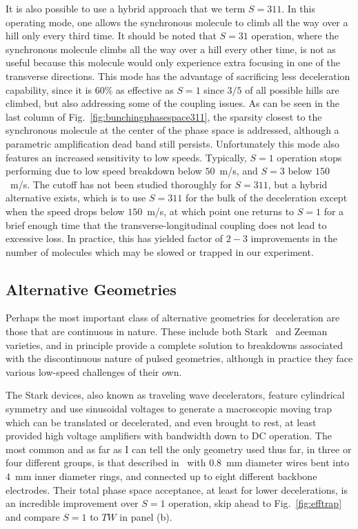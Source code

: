 It is also possible to use a hybrid approach that we term $S=311$.
In this operating mode, one allows the synchronous molecule to climb all the way over a hill only every third time.
It should be noted that $S=31$ operation, where the synchronous molecule climbs all the way over a hill every other time, is not as useful because this molecule would only experience extra focusing in one of the transverse directions.
This mode has the advantage of sacrificing less deceleration capability, since it is $60\%$ as effective as $S=1$ since $3/5$ of all possible hills are climbed, but also addressing some of the coupling issues.
As can be seen in the last column of Fig.~\ref{fig:bunchingphasespace311}, the sparsity closest to the synchronous molecule at the center of the phase space is addressed, although a parametric amplification dead band still persists.
Unfortunately this mode also features an increased sensitivity to low speeds.
Typically, $S=1$ operation stops performing due to low speed breakdown below $50$~m/s, and $S=3$ below $150$~m/s.
The cutoff has not been studied thoroughly for $S=311$, but a hybrid alternative exists, which is to use $S=311$ for the bulk of the deceleration except when the speed drops below $150$~m/s, at which point one returns to $S=1$ for a brief enough time that the transverse-longitudinal coupling does not lead to excessive loss.
In practice, this has yielded factor of $2-3$ improvements in the number of molecules which may be slowed or trapped in our experiment.

\subsection{Alternative Geometries}

Perhaps the most important class of alternative geometries for deceleration are those that are continuous in nature. 
These include both Stark~\cite{Osterwalder2010} and Zeeman~\cite{Narevicius2008} varieties, and in principle provide a complete solution to breakdowns associated with the discontinuous nature of pulsed geometries, although in practice they face various low-speed challenges of their own.

The Stark devices, also known as traveling wave decelerators, feature cylindrical symmetry and use sinusoidal voltages to generate a macroscopic moving trap which can be translated or decelerated, and even brought to rest, at least provided high voltage amplifiers with bandwidth down to DC operation.
The most common and as far as I can tell the only geometry used thus far, in three or four different groups, is that described in~\cite{Osterwalder2010} with $0.8$~mm diameter wires bent into $4$~mm inner diameter rings, and connected up to eight different backbone electrodes.
Their total phase space acceptance, at least for lower decelerations, is an incredible improvement over $S=1$ operation, skip ahead to Fig.~\ref{fig:efftrap} and compare $S=1$ to $TW$ in panel (b).

